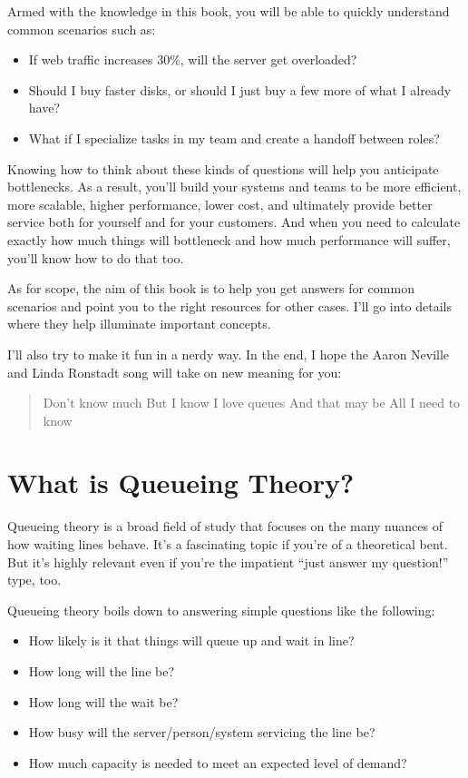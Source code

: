 \documentclass{vivid_layout_pdf}
\begin{document}
Armed with the knowledge in this book, you will be able to quickly understand common scenarios such as:

\begin{itemize}
\item If web traffic increases 30\%, will the server get overloaded?
\item Should I buy faster disks, or should I just buy a few more of what I already have?
\item What if I specialize tasks in my team and create a handoff between roles?
\end{itemize}

Knowing how to think about these kinds of questions will help you anticipate bottlenecks. As a result, you'll build your systems and teams to be more efficient, more scalable, higher performance, lower cost, and ultimately provide better service both for yourself and for your customers. And when you need to calculate exactly how much things will bottleneck and how much performance will suffer, you'll know how to do that too.

As for scope, the aim of this book is to help you get answers for common scenarios and point you to the right resources for other cases. I'll go into details where they help illuminate important concepts.

I'll also try to make it fun in a nerdy way. In the end, I hope the Aaron Neville and Linda Ronstadt song will take on new meaning for you:

\begin{quote}
Don't know much\newline
But I know I love queues\newline
And that may be\newline
All I need to know
\end{quote}

\section{What is Queueing Theory?}

Queueing theory is a broad field of study that focuses on the many nuances of how waiting lines behave. It's a fascinating topic if you're of a theoretical bent. But it's highly relevant even if you're the impatient ``just answer my question!'' type, too.

Queueing theory boils down to answering simple questions like the following:

\begin{itemize}
\item How likely is it that things will queue up and wait in line?
\item How long will the line be?
\item How long will the wait be?
\item How busy will the server/person/system servicing the line be?
\item How much capacity is needed to meet an expected level of demand?
\end{itemize}
\end{document}
